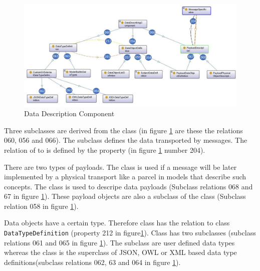 \begin{figure}[htbp]
	\centering
	\includegraphics[width=0.9\linewidth]{Figures/Ontology/SubjectInteraction/20181218-Data}
	\caption[Data Description Component]{Data Description Component}
	\label{fig:20181218-data}
\end{figure}

Three subclasses are derived from the class  (in figure \ref{fig:20181218-data} are these the relations 060, 056 and 066). The subclass  defines the data transported by messages. The relation of  to  is defined by the property  (in figure \ref{fig:20181218-data} number 204).

There are two types of payloads. The class  is used if a message will be later implemented by a physical transport like a parcel in models that describe such concepts. The class  is used to descripe data payloads (Subclass relations 068 and 67 in figure \ref{fig:20181218-data}). These payload objects are also a subclass of the class  (Subclass relation 058 in figure \ref{fig:20181218-data}).

Data objects have a certain type. Therefore class  has the relation  to class \texttt{DataTypeDefinition} (property 212 in figure\ref{fig:20181218-data}). Class  has two subclasses (subclass relations 061 and 065 in figure \ref{fig:20181218-data}). The subclass  are user defined data types whereas the class  is the superclass of JSON, OWL or XML based data type definitions(subclass relations 062, 63 and 064 in figure \ref{fig:20181218-data}).